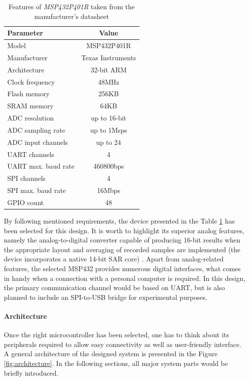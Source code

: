 \documentclass[12pt,a4paper]{article}
\begin{document}
\begin{table}[ht!]
\begin{tabular}{|l|c|}
\hline
\textbf{Parameter}	& \textbf{Value} 	\\ \hline
Model  				& MSP432P401R       \\ \hline
Manufacturer    	& Texas Instruments	\\ \hline
Architecture       	&  32-bit ARM 		\\ \hline
Clock frequency     &  48MHz			\\ \hline
Flash memory        &  256KB			\\ \hline
SRAM memory         &  64KB				\\ \hline
ADC resolution 		&  up to 16-bit		\\ \hline
ADC sampling rate 	&  up to 1Msps 		\\ \hline
ADC input channels 	&  up to 24  		\\ \hline
UART channels 		&  4 				\\ \hline
UART max. baud rate &  460800bps 		\\ \hline
SPI channels 		&  4 				\\ \hline
SPI max. baud rate &  16Mbps 			\\ \hline
GPIO count			& 48				\\ \hline
\end{tabular}
\caption{Features of \textit{MSP432P401R} taken from the manufacturer's datasheet \cite{msp432_params}}
\label{tab:MSP432_params}
\end{table}

\par
By following mentioned requirements, the device presented in the Table \ref{tab:MSP432_params} has been selected for this design. It is worth to highlight its superior analog features, namely the analog-to-digital converter capable of producing 16-bit results when the appropriate layout and averaging of recorded samples are implemented (the device incorporates a native 14-bit SAR core) \cite{16bit}. Apart from analog-related features, the selected MSP432 provides numerous digital interfaces, what comes in handy when a connection with a personal computer is required. In this design, the primary communication channel would be based on UART, but is also planned to include an SPI-to-USB bridge for experimental purposes.
\par

\paragraph{Architecture}
Once the right microcontroller has been selected, one has to think about its peripherals required to allow easy connectivity as well as user-friendly interface. A general architecture of the designed system is presented in the Figure \ref{fig:architecture}. In the following sections, all major system parts would be briefly introduced.
\end{document}
